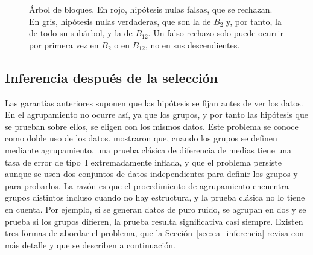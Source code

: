 \begin{figure}[ht]
  \centering
  \caption{Árbol de bloques. En rojo, hipótesis nulas falsas, que se rechazan. En
  gris, hipótesis nulas verdaderas, que son la de $B_2$ y, por tanto, la de todo su subárbol, y la de $B_{12}$. Un falso rechazo solo puede ocurrir por primera vez en $B_2$ o en $B_{12}$, no en sus descendientes.}
  \label{fig:subarboles-nulos}
\end{figure}

\subsection{Inferencia después de la selección}\label{sec:est-seleccion}

Las garantías anteriores suponen que las hipótesis se fijan antes de ver los
datos. En el agrupamiento no ocurre así, ya que los grupos, y por tanto las
hipótesis que se prueban sobre ellos, se eligen con los mismos datos. Este
problema se conoce como doble uso de los datos. \cite{Gao2024} mostraron que, cuando los grupos
se definen mediante agrupamiento, una prueba clásica de diferencia de medias
tiene una tasa de error de tipo~I extremadamente inflada, y que el problema
persiste aunque se usen dos conjuntos de datos independientes para definir los
grupos y para probarlos. La razón es que el procedimiento de agrupamiento
encuentra grupos distintos incluso cuando no hay estructura, y la prueba clásica no lo tiene en cuenta. Por ejemplo, si se generan datos de puro ruido, se agrupan en dos y se prueba si los grupos difieren, la prueba resulta significativa casi siempre. Existen tres
formas de abordar el problema, que la Sección~\ref{sec:ea_inferencia} revisa con
más detalle y que se describen a continuación.


